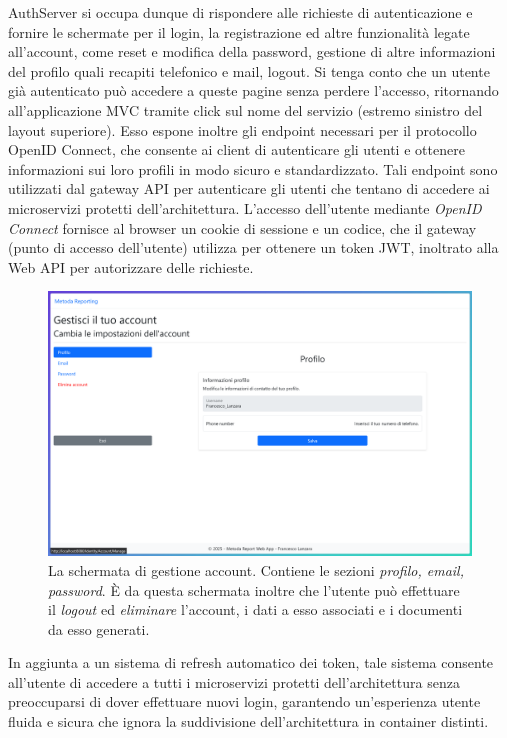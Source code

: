 AuthServer si occupa dunque di rispondere alle richieste di autenticazione e fornire le schermate per il login, la registrazione ed altre funzionalità legate all'account, come reset e modifica della password, gestione di altre informazioni del profilo quali recapiti telefonico e mail, logout. Si tenga conto che un utente già autenticato può accedere a queste pagine senza perdere l'accesso, ritornando all'applicazione MVC tramite click sul nome del servizio (estremo sinistro del layout superiore).
Esso espone inoltre gli endpoint necessari per il protocollo OpenID Connect, che consente ai client di autenticare gli utenti e ottenere informazioni sui loro profili in modo sicuro e standardizzato. Tali endpoint sono utilizzati dal gateway API per autenticare gli utenti che tentano di accedere ai microservizi protetti dell'architettura.
L'accesso dell'utente mediante \emph{OpenID Connect} fornisce al browser un cookie di sessione e un codice, che il gateway (punto di accesso dell'utente) utilizza per ottenere un token JWT, inoltrato alla Web API per autorizzare delle richieste.
\begin{figure}[H]
        \centering
        \includegraphics[width=15.5cm]{fig/screen_manage.png}
        \caption[Schermata gestione utente]{La schermata di gestione account. Contiene le sezioni \emph{profilo, email, password}. È da questa schermata inoltre che l'utente può effettuare il \emph{logout} ed \emph{eliminare} l'account, i dati a esso associati e i documenti da esso generati.}
\end{figure}

In aggiunta a un sistema di refresh automatico dei token, tale sistema consente all'utente di accedere a tutti i microservizi protetti dell'architettura senza preoccuparsi di dover effettuare nuovi login, garantendo un'esperienza utente fluida e sicura che ignora la suddivisione dell'architettura in container distinti.

